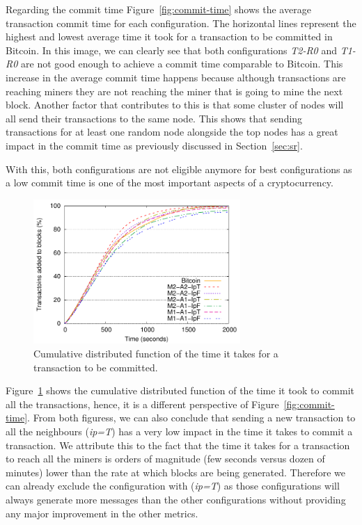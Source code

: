 Regarding the commit time Figure~\ref{fig:commit-time} shows the average transaction commit time for each configuration.
The horizontal lines represent the highest and lowest average time it took for a transaction to be committed in Bitcoin. 
In this image, we can clearly see that both configurations \textsl{T2-R0} and \textsl{T1-R0} are not good enough to achieve a commit time comparable to Bitcoin. This increase in the average commit time happens because although transactions are reaching miners they are not reaching the miner that is going to mine the next block. Another factor that contributes to this is that some cluster of nodes will all send their transactions to the same node.  This shows that sending transactions for at least one random node alongside the top nodes has a great impact in the commit time as previously discussed in Section~\ref{sec:sr}.

With this, both configurations are not eligible anymore for best configurations as a low commit time is one of the most important aspects of a cryptocurrency.

\begin{figure}[h]
\centering
\includegraphics[width=0.7\textwidth]{plots/cdf_commit.pdf}
\caption{Cumulative distributed function of the time it takes for a transaction to be committed.}
\label{fig:cdf-commit}
\end{figure}

Figure~\ref{fig:cdf-commit} shows the cumulative distributed function of the time it took to commit all the transactions, hence, it is a different perspective of Figure~\ref{fig:commit-time}. 
From both figuress, we can also conclude that sending a new transaction to all the neighbours (\emph{ip=T}) has a very low impact in the time it takes to commit a transaction. We attribute this to the fact that the time it takes for a transaction to reach all the miners is orders of magnitude (few seconds versus dozen of minutes) lower than the rate at which blocks are being generated. Therefore we can already exclude the configuration with (\emph{ip=T}) as those configurations will always generate more messages than the other configurations without providing any major improvement in the other metrics.


